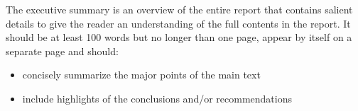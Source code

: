 \begin{Executive Summary}
	The executive summary is an overview of the entire report that contains salient details to give the reader an understanding of the full contents in the report. It should be at least 100 words but no longer than one page, appear by itself on a separate page and should:

    \begin{itemize}
    	\item concisely summarize the major points of the main text
    	\item include highlights of the conclusions and/or recommendations
    \end{itemize}
\end{Executive Summary}
